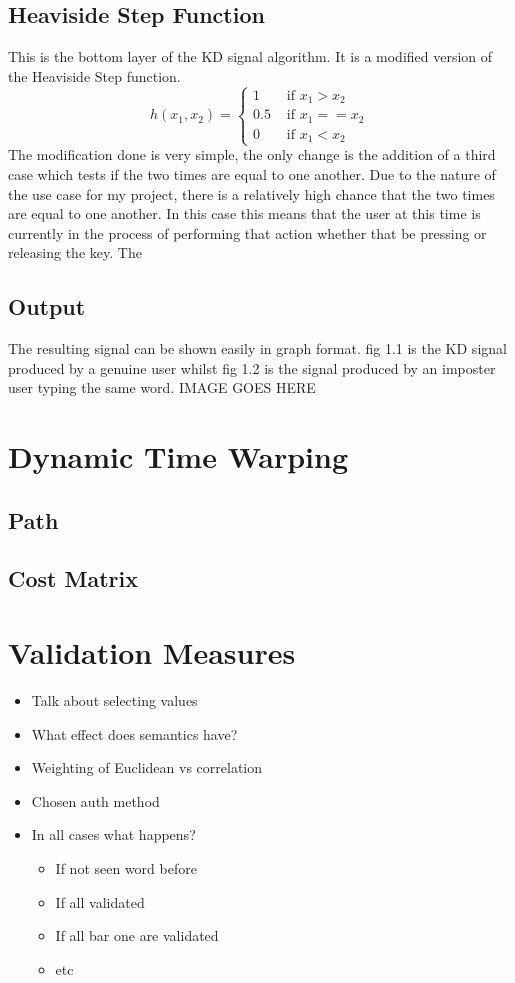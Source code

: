 \documentclass[10pt,a4paper]{report}
\begin{document}
\subsection{Heaviside Step Function}
This is the bottom layer of the KD signal algorithm. It is a modified version of the Heaviside Step function.
\begin{equation}
	h(x_1, x_2) = \begin{cases}
	1 & \text{ if } x_1 > x_2 \\
	0.5 & \text{ if } x_1 == x_2 \\
	0 & \text{ if } x_1 < x_2
\end{cases}
\end{equation}
The modification done is very simple, the only change is the addition of a third case which tests if the two times are equal to one another. Due to the nature of the use case for my project, there is a relatively high chance that the two times are equal to one another. In this case this means that the user at this time is currently in the process of performing that action whether that be pressing or releasing the key. The

\subsection{Output}
The resulting signal can be shown easily in graph format. fig 1.1 is the KD signal produced by a genuine user whilst fig 1.2 is the signal produced by an imposter user typing the same word.
IMAGE GOES HERE

\section{Dynamic Time Warping}
\subsection{Path}
\subsection{Cost Matrix}
\section{Validation Measures}
\begin{itemize}
	\item Talk about selecting values
	\item What effect does semantics have?
	\item Weighting of Euclidean vs correlation
	\item Chosen auth method
	\item In all cases what happens?
	\begin{itemize}
		\item If not seen word before
		\item If all validated
		\item If all bar one are validated
		\item etc
	\end{itemize}
\end{itemize}
\end{document}
